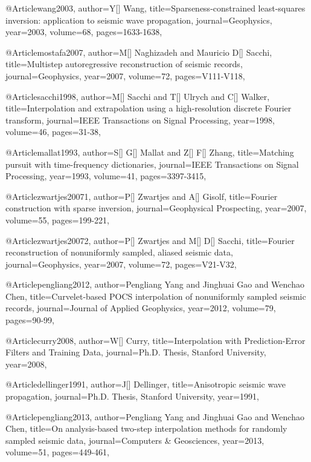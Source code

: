 {@Article{wang2003,
  author={Y[] Wang},
  title={Sparseness-constrained least-squares inversion: application to seismic wave propagation},
  journal={Geophysics},
  year=2003,
  volume=68,
  pages={1633-1638},
}

@Article{mostafa2007,
  author={M[] Naghizadeh and Mauricio D[] Sacchi},
  title={Multistep autoregressive reconstruction of seismic records},
  journal={Geophysics},
  year=2007,
  volume=72,
  pages={V111-V118},
}

@Article{sacchi1998,
  author={M[] Sacchi and T[] Ulrych and C[] Walker},
  title={Interpolation and extrapolation using a high-resolution discrete Fourier transform},
  journal={IEEE Transactions on Signal Processing},
  year=1998,
  volume=46,
  pages={31-38},
}

@Article{mallat1993,
  author={S[] G[] Mallat and Z[] F[] Zhang},
  title={Matching pursuit with time-frequency dictionaries},
  journal={IEEE Transactions on Signal Processing},
  year=1993,
  volume=41,
  pages={3397-3415},
}

@Article{zwartjes20071,
  author={P[] Zwartjes and A[] Gisolf},
  title={Fourier construction with sparse inversion},
  journal={Geophysical Prospecting},
  year=2007,
  volume=55,
  pages={199-221},
}

@Article{zwartjes20072,
  author={P[] Zwartjes and M[] D[] Sacchi},
  title={Fourier reconstruction of nonuniformly sampled, aliased seismic data},
  journal={Geophysics},
  year=2007,
  volume=72,
  pages={V21-V32},
}

@Article{pengliang2012,
  author={Pengliang Yang and Jinghuai Gao and Wenchao Chen},
  title={Curvelet-based {POCS} interpolation of nonuniformly sampled seismic records},
  journal={Journal of Applied Geophysics},
  year=2012,
  volume=79,
  pages={90-99},
}

@Article{curry2008,
  author={W[] Curry},
  title={Interpolation with Prediction-Error Filters and Training Data},
  journal={Ph.D. Thesis, Stanford University},
  year=2008,
}

@Article{dellinger1991,
  author={J[] Dellinger},
  title={Anisotropic seismic wave propagation},
  journal={Ph.D. Thesis, Stanford University},
  year=1991,
}

@Article{pengliang2013,
  author={Pengliang Yang and Jinghuai Gao and Wenchao Chen},
  title={On analysis-based two-step interpolation methods for randomly sampled seismic data},
  journal={Computers \& Geosciences},
  year=2013,
  volume=51,
  pages={449-461},
}

}
